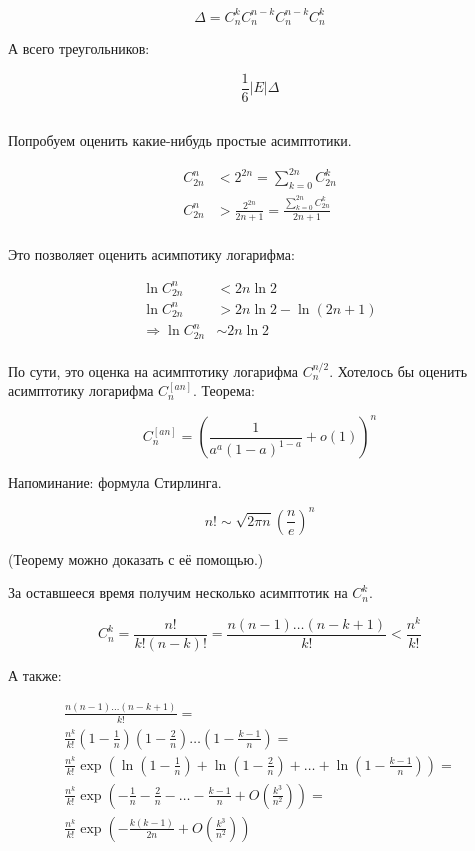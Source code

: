 \documentclass[12pt]{article}
\begin{document}
\[ \Delta = C_n^k C_n^{n-k} C_n^{n-k} C_n^k \]

А всего треугольников:

\[ \frac 1 6 |E| \Delta \]

\subsection{}

Попробуем оценить какие-нибудь простые асимптотики.

\begin{align*}
C^n_{2n} &< 2^{2n} = \sum_{k=0}^{2n} C^k_{2n} \\
C^n_{2n} &> \frac {2^{2n}} {2n + 1} = \frac {\sum_{k=0}^{2n} C^k_{2n}} {2n + 1} \\
\end{align*}

Это позволяет оценить асимпотику логарифма:

\begin{align*}
\ln C^n_{2n} &< 2n \ln 2 \\
\ln C^n_{2n} &> 2n \ln 2 - \ln(2n + 1) \\
\Rightarrow \ln C^n_{2n} &\sim 2n \ln 2 \\
\end{align*}

По сути, это оценка на асимптотику логарифма $C^{n/2}_n$. Хотелось бы оценить асимптотику логарифма $C^{[an]}_n$. Теорема:

\[ C^{[an]}_n = \left( \frac 1 {a^a (1-a)^{1-a}} + o(1) \right)^n \]

Напоминание: формула Стирлинга.

\[ n! \sim \sqrt{2 \pi n} \left( \frac n e \right)^n \]

(Теорему можно доказать с её помощью.)

За оставшееся время получим несколько асимптотик на $C^k_n$.

\[ C^k_n = \frac {n!} {k! (n-k)!} = \frac {n (n-1) \ldots (n - k + 1)} {k!}  < \frac {n^k} {k!} \]

А также:

\begin{multline*}
\frac {n (n-1) \ldots (n - k + 1)} {k!} = \\
\frac {n^k} {k!} \left(1 - \frac 1 n \right) \left(1 - \frac 2 n \right) \ldots \left(1 - \frac {k-1} n \right) = \\
\frac {n^k} {k!} \exp \left( \ln\left(1 - \frac 1 n \right) + \ln \left(1 - \frac 2 n \right) + \ldots + \ln \left(1 - \frac {k-1} n \right) \right) = \\
\frac {n^k} {k!} \exp \left( - \frac 1 n - \frac 2 n - \ldots - \frac {k-1} n + O\left(\frac {k^3} {n^2}\right) \right) = \\
\frac {n^k} {k!} \exp \left( - \frac {k (k-1)} {2n} + O \left(\frac {k^3} {n^2} \right) \right)
\end{multline*}
\end{document}
